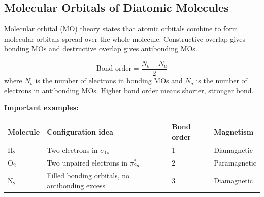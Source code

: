 \documentclass[12pt,a4paper]{article}
\begin{document}
\begin{tcolorbox}[tikzbox, title={Particle in a Box: Quantized Standing Waves}]
\centering
{}
\end{tcolorbox}

\subsection{Molecular Orbitals of Diatomic Molecules}
Molecular orbital (MO) theory states that atomic orbitals combine to form molecular orbitals spread over the whole molecule. Constructive overlap gives bonding MOs and destructive overlap gives antibonding MOs.

\begin{tcolorbox}[formulabox, title={Bond Order}]
\[
\text{Bond order}=\frac{N_b-N_a}{2}
\]
where $N_b$ is the number of electrons in bonding MOs and $N_a$ is the number of electrons in antibonding MOs. Higher bond order means shorter, stronger bond.
\end{tcolorbox}

\textbf{Important examples:}\par\noindent
\begin{tabularx}{\linewidth}{|B{2.8cm}|Y|Y|Y|}
\hline
\textbf{Molecule} & \textbf{Configuration idea} & \textbf{Bond order} & \textbf{Magnetism} \\
\hline
$\mathrm{H_2}$ & Two electrons in $\sigma_{1s}$ & 1 & Diamagnetic \\
\hline
$\mathrm{O_2}$ & Two unpaired electrons in $\pi^*_{2p}$ & 2 & Paramagnetic \\
\hline
$\mathrm{N_2}$ & Filled bonding orbitals, no antibonding excess & 3 & Diamagnetic \\
\hline
\end{tabularx}
\end{document}
